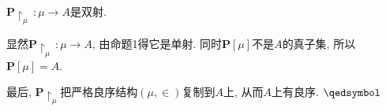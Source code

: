 \documentclass[UTF8]{ctexart}
\begin{document}
\vspace{7pt}\hspace{-1em}
$\mathbf{P}\!\restriction_\mu\,:\mu\to A$是双射.

显然$\mathbf{P}\!\restriction_\mu\,:\mu\to A$, 由命题1得它是单射.
同时$\mathbf{P}[\mu]$不是$A$的真子集, 所以$\mathbf{P}[\mu]=A$.

\vspace{7pt}
最后, $\mathbf{P}\!\restriction_\mu$把严格良序结构$(\mu,\in)$复制到$A$上,
从而$A$上有良序. \hfill $\qedsymbol$
\end{document}
